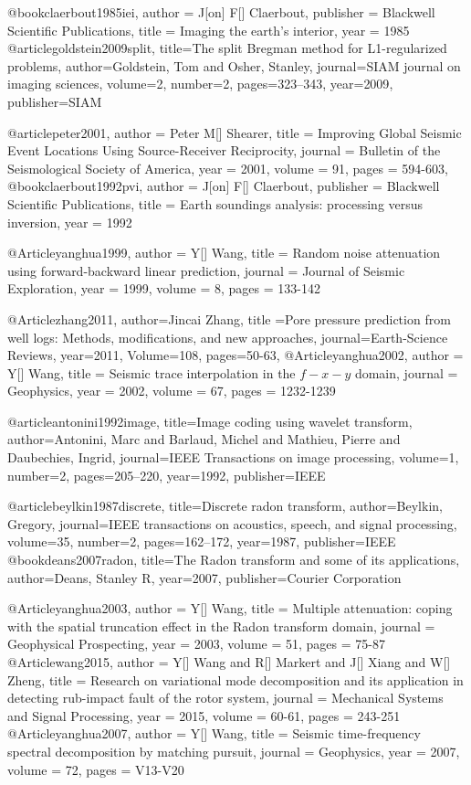 @book{claerbout1985iei,
   author = {J[on] F[] Claerbout},
   publisher = {Blackwell Scientific Publications},
   title = {Imaging the earth's interior},
   year = {1985}
}
@article{goldstein2009split,
  title={The split Bregman method for L1-regularized problems},
  author={Goldstein, Tom and Osher, Stanley},
  journal={SIAM journal on imaging sciences},
  volume={2},
  number={2},
  pages={323--343},
  year={2009},
  publisher={SIAM}
}

@article{peter2001,
  author =	 {Peter M[] Shearer},
  title =	 {Improving Global Seismic Event Locations Using Source-Receiver Reciprocity},
  journal = 	 {Bulletin of the Seismological Society of America},
  year = 	 2001,
  volume =	 91,
  pages =	 {594-603},
}
@book{claerbout1992pvi,
   author = {J[on] F[] Claerbout},
   publisher = {Blackwell Scientific Publications},
   title = {Earth soundings analysis: processing versus inversion},
   year = {1992}
}

@Article{yanghua1999,
  author = 	 {Y[] Wang},
  title = 	 {Random noise attenuation using forward-backward linear prediction},
  journal = 	 {Journal of Seismic Exploration},
  year = 	 1999,
  volume =	 8,
  pages =	 {133-142}
}

@Article{zhang2011,
  author={Jincai Zhang},
  title ={Pore pressure prediction from well logs: Methods, modifications, and new approaches},
  journal={Earth-Science Reviews},
  year=2011,
  Volume=108,
  pages={50-63},
}
@Article{yanghua2002,
  author = 	 {Y[] Wang},
  title = 	 {Seismic trace interpolation in the $f-x-y$ domain},
  journal = 	 {Geophysics},
  year = 	 2002,
  volume =	 67,
  pages =	 {1232-1239}
}

@article{antonini1992image,
  title={Image coding using wavelet transform},
  author={Antonini, Marc and Barlaud, Michel and Mathieu, Pierre and Daubechies, Ingrid},
  journal={IEEE Transactions on image processing},
  volume={1},
  number={2},
  pages={205--220},
  year={1992},
  publisher={IEEE}
}

@article{beylkin1987discrete,
  title={Discrete radon transform},
  author={Beylkin, Gregory},
  journal={IEEE transactions on acoustics, speech, and signal processing},
  volume={35},
  number={2},
  pages={162--172},
  year={1987},
  publisher={IEEE}
}
@book{deans2007radon,
  title={The Radon transform and some of its applications},
  author={Deans, Stanley R},
  year={2007},
  publisher={Courier Corporation}
}

@Article{yanghua2003,
  author = 	 {Y[] Wang},
  title = 	 {Multiple attenuation: coping with the spatial truncation effect in the Radon transform domain},
  journal = 	 {Geophysical Prospecting},
  year = 	 2003,
  volume =	 51,
  pages =	 {75-87}
}
@Article{wang2015,
  author = 	 {Y[] Wang and R[] Markert and J[] Xiang and W[] Zheng},
  title = 	 {Research on variational mode decomposition and its application in detecting rub-impact fault of the rotor system},
  journal = 	 {Mechanical Systems and Signal Processing},
  year = 	 2015,
  volume =	 60-61,
  pages =	 {243-251}
}
@Article{yanghua2007,
  author = 	 {Y[] Wang},
  title = 	 {Seismic time-frequency spectral decomposition by matching pursuit},
  journal = 	 {Geophysics},
  year = 	 2007,
  volume =	 72,
  pages =	 {V13-V20}
}

